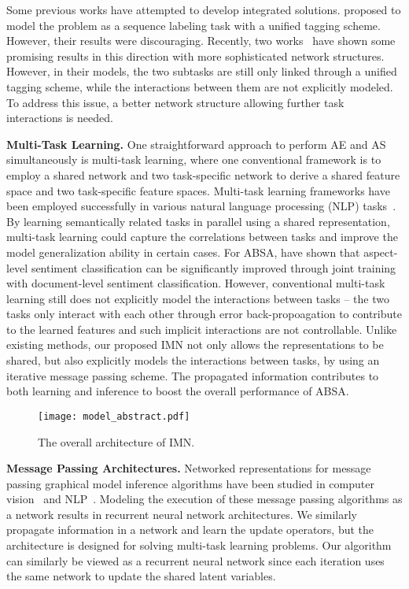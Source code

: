 \documentclass[11pt,a4paper]{article}
\begin{document}
Some previous works have attempted to develop integrated solutions. \citet{zhang:15} proposed to model the problem as a sequence labeling task with a unified tagging scheme. However, their results were discouraging. Recently, two works~\citep{Wang:18b, Li:19} have shown some promising results in this direction with more sophisticated network structures. However, in their models, the two subtasks are still only linked through a unified tagging scheme, while the interactions between them are not explicitly modeled. To address this issue, a better network structure allowing further task interactions is needed. 
\medskip

\noindent \textbf{Multi-Task Learning.}
One straightforward approach to perform AE and AS simultaneously is multi-task learning, where one conventional framework is to employ a shared network and two task-specific network to derive a shared feature space and two task-specific feature spaces. Multi-task learning frameworks have been employed successfully in various natural language processing (NLP) tasks~\citep{Collobert:08, Luong:15a, Liu:16}. By learning semantically related tasks in parallel using a shared representation, multi-task learning could capture the correlations between tasks and improve the model generalization ability in certain cases. For ABSA, \citet{He:18} have shown that aspect-level sentiment classification can be significantly improved through joint training with document-level sentiment classification. However, conventional multi-task learning still does not explicitly model the interactions between tasks -- the two tasks only interact with each other through error back-propoagation to contribute to the learned features and such implicit interactions are not controllable. Unlike existing methods, our proposed IMN not only allows the representations to be shared, but also explicitly models the interactions between tasks, by using an iterative message passing scheme. The propagated information contributes to both learning and inference to boost the overall performance of ABSA.
\medskip

\begin{figure*}[ht] 
\centering
\texttt{[image: model\_abstract.pdf]}
\caption{The overall architecture of IMN.}
\label{overall_architecture_diagram}
\end{figure*}

\noindent \textbf{Message Passing Architectures.}
Networked representations for message passing graphical model inference algorithms have been studied in computer vision~\citep{arnab2018conditional} and NLP~\citep{gormley2015approximation}. Modeling the execution of these message passing algorithms as a network results in recurrent neural network architectures. 
We similarly propagate information in a network and learn the update operators, but the architecture is designed for solving multi-task learning problems. Our algorithm can similarly be viewed as a recurrent neural network since each iteration uses the same network to update the shared latent variables.
\end{document}
